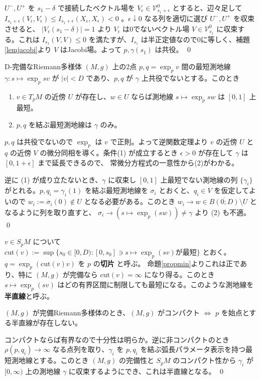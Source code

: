 \documentclass[dvipdfmx,a4paper]{jsreport}
\theoremstyle{definition}
\renewcommand{\bar}{\overline}
\begin{document}
$U^-,U^+$ を $s_1-\delta$ で接続したベクトル場を $V_\epsilon \in \mathcal{V}^0_{s_1+\epsilon}$ とすると、辺々足して $I_{s_1+\epsilon}(V_\epsilon,V_\epsilon) \leq I_{s_1+\epsilon}(X_\epsilon,X_\epsilon)<0$ 。$\epsilon \downarrow 0$ なる列を適切に選び $U^-,U^+$ を収束させると、 $|V_\epsilon(s_1-\delta)|=1$ より $V_\epsilon$ は0でないベクトル場 $V \in \mathcal{V}^0_{s_1}$ に収束する。これは $I_{s_1}(V,V) \leq 0$ を満たすが、$I_{s_1}$ は半正定値なので0に等しく、補題\ref{lemjacobi}より $V$ はJacobi場。よって $p,\gamma(s_1)$ は共役。
\qed

\lem\label{lemnbhd} D-完備なRiemann多様体 $(M,g)$ 上の2点 $p,q=\exp_p v$ 間の最短測地線 $\gamma:s \mapsto \exp_p sv$ が  $|v|<D$ であり、$p,q$ が $\gamma$ 上共役でないとする。このとき
\begin{enumerate}
    \item $v \in T_pM$ の近傍 $U$ が存在し、$w \in U$ ならば測地線 $s \mapsto \exp_p sw$ は $[0,1]$ 上最短。
    \item $p,q$ を結ぶ最短測地線は $\gamma$ のみ。
\end{enumerate}

\prf $p,q$ は共役でないので $\exp_p$ は $v$ で正則。よって逆関数定理より $v$ の近傍 $U$ と $q$ の近傍 $V$ の微分同相を導く。条件(1) が成立するとき $\epsilon>0$ が存在して $\gamma$ は $[0,1+\epsilon]$ まで延長できるので、
常微分方程式の一意性から(2)がわかる。

逆に (1) が成り立たないとき、$\gamma$ に収束し $[0,1]$ 上最短でない測地線の列 $\{\gamma_i\}$ がとれる。$p,q_i=\gamma_i(1)$ を結ぶ最短測地線を $\sigma_i$ とおくと、$q_i \in V$ を仮定してよいので $w_i:=\dot{\sigma_i}(0) \notin U$ となる必要がある。このとき $w_i \to w \in \bar{B(0;D)} \setminus U$ となるように列を取り直すと、 $\sigma_i \to (s \mapsto \exp_p(sw)) \neq \gamma$ より (2) も不適。 \qed

 $v \in S_pM$ について $\mbox{cut}(v):=\sup\{s_0 \in [0,D) \colon [0,s_0] \ni s \mapsto \exp_p(sv)\mbox{が最短}\}$  とおく。$q=\exp_p(\mbox{cut}(v)v)$ を $p$ の\textbf{切片} と呼ぶ。 命題\ref{propmin}よりこれは正であり、特に $(M,g)$ が完備なら $\mbox{cut}(v)=\infty$ になり得る。このとき $s \mapsto \exp_p(sv)$ はどの有界区間に制限しても最短になる。このような測地線を\textbf{半直線}と呼ぶ。

\lem $(M,g)$ が完備Riemann多様体のとき、$(M,g)$ がコンパクト $\iff$ $p$ を始点とする半直線が存在しない。

\prf コンパクトならば有界なので十分性は明らか。逆に非コンパクトのとき $\rho(p,q_i) \to \infty$ なる点列を取り、$\gamma_i$ を $p,q_i$ を結ぶ弧長パラメータ表示を持つ最短測地線とする。このとき $(M,g)$ の完備性と $S_pM$ のコンパクト性から $\gamma_i$ が $[0,\infty)$ 上の測地線 $\gamma$ に収束するようにでき、これは半直線となる。 \qed
\end{document}
